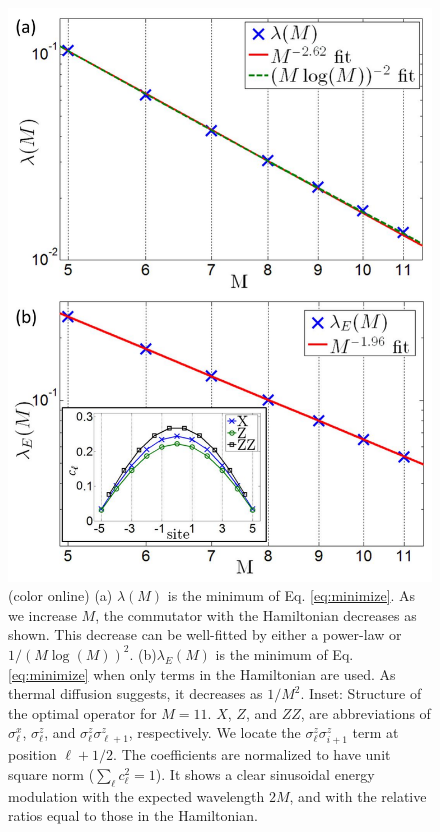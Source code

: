 \documentclass[twocolumn,superscriptaddress, prb]{revtex4-1}
\begin{document}
\begin{figure}
\includegraphics[width=0.95\linewidth]{fig_hamiltonian.pdf}
\centering
\caption{(color online) (a) $\lambda(M)$ is the minimum of Eq. \eqref{eq:minimize}.  As we increase $M$, the commutator with the Hamiltonian decreases as shown.
This decrease can be well-fitted by either a power-law or $1/(M\log(M))^2$.
(b)$\lambda_E(M)$ is the minimum of Eq. \eqref{eq:minimize} when only terms in the Hamiltonian are used.  As thermal diffusion suggests, it decreases as $1/M^2$. Inset: Structure of the optimal operator for $M = 11$. $X$, $Z$, and $ZZ$, are
abbreviations of $\sigma^x_\ell$, $\sigma^z_\ell$, and $\sigma^z_\ell \sigma^z_{\ell+1}$, respectively.
We locate the $\sigma^z_\ell \sigma^z_{i+1}$ term at position $\ell+1/2$.  The coefficients are normalized to have unit square norm ($\sum_\ell c_\ell^2 = 1$).
It shows a clear sinusoidal energy modulation with the expected wavelength $2M$, and with the relative ratios equal to those in the Hamiltonian.}
\label{fig:hamiltonian}
\end{figure}
\end{document}
